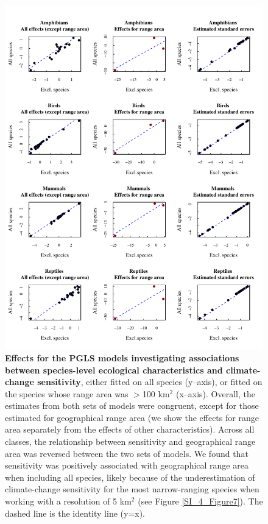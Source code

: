 \documentclass[11pt]{article}
\begin{document}
\begin{figure}[h!]
\centering
\includegraphics[scale=0.9, trim={0 0 5.5cm 0}, clip]{Figures/ClimateChangeModelsEstimates.pdf}
\caption[Effects for the PGLS models investigating associations between species-level ecological characteristics and climate-change sensitivity, either fitted on all species (y--axis), or fitted on the species whose range area was $>$100 km$^2$ (x--axis)]{\textbf{Effects for the PGLS models investigating associations between species-level ecological characteristics and climate-change sensitivity}, either fitted on all species (y--axis), or fitted on the species whose range area was $>$100 km$^2$ (x--axis). Overall, the estimates from both sets of models were congruent, except for those estimated for geographical range area (we show the effects for range area separately from the effects of other characteristics). Across all classes, the relationship between sensitivity and geographical range area was reversed between the two sets of models. We found that sensitivity was positively associated with geographical range area when including all species, likely because of the underestimation of climate-change sensitivity for the most narrow-ranging species when working with a resolution of 5 km$^2$ (see Figure \ref{SI_4_Figure7}). The dashed line is the identity line (y=x).}
\label{SI_4_Figure_22}
\end{figure}
\end{document}
